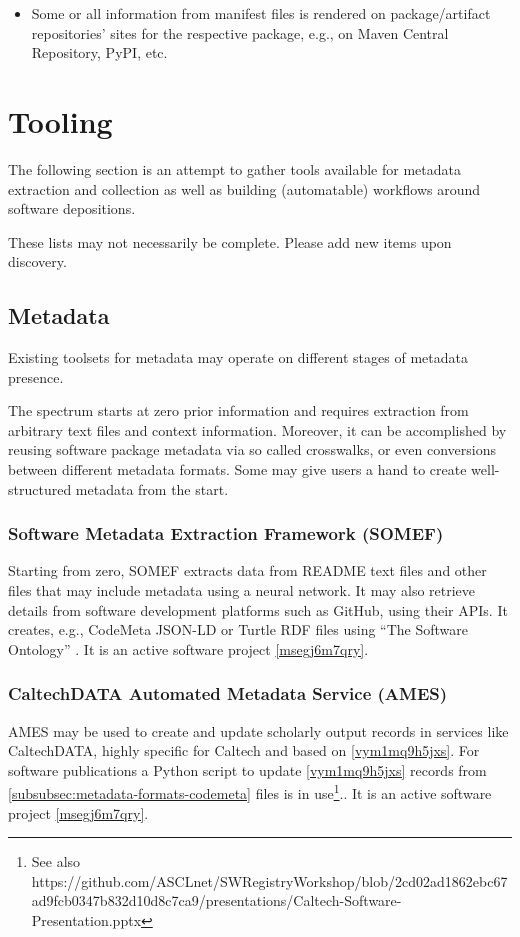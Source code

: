 \documentclass{article}
\begin{document}
\begin{itemize}  
\item Some or all information from manifest files is rendered on package/artifact repositories’ sites for the respective package, e.g., on Maven Central Repository, PyPI, etc.


\end{itemize}

\section{Tooling}\label{sec:tooling}
The following section is an attempt to gather tools available for metadata extraction and collection as well as building (automatable) workflows around software depositions.

These lists may not necessarily be complete. Please add new items upon discovery. 



\subsection{Metadata}\label{subsec:tooling-metadata}
Existing toolsets for metadata may operate on different stages of metadata presence.

The spectrum starts at zero prior information and requires extraction from arbitrary text files and context information. Moreover, it can be accomplished by reusing software package metadata via so called crosswalks, or even  conversions between different metadata formats. Some may give users a hand to create well-structured metadata from the start.



\subsubsection{Software Metadata Extraction Framework (SOMEF)}\label{qz3d8r3z48k}
Starting from zero, SOMEF \cite{11045035/AWIJVT4K} \cite{11045035/E5BAXQ4Y} extracts data from README text files and other files that may include metadata using a neural network. It may also retrieve details from software development platforms such as GitHub, using their APIs. It creates, e.g., CodeMeta JSON-LD or Turtle RDF files using “The Software Ontology” \cite{11045035/TVVPYY5L}. It is an active software project \ref{msegj6m7qry}.



\subsubsection{CaltechDATA Automated Metadata Service (AMES)}\label{v9uri13hoesk}
AMES \cite{11045035/CBYX26KG} may be used to create and update scholarly output records in services like CaltechDATA, highly specific for Caltech and based on \ref{vym1mq9h5jxs}. For software publications a Python script to update \ref{vym1mq9h5jxs} records from \ref{subsubsec:metadata-formats-codemeta} files is in use\footnote{See also https://github.com/ASCLnet/SWRegistryWorkshop/blob/2cd02ad1862ebc67ad9fcb0347b832d10d8c7ca9/presentations/Caltech-Software-Presentation.pptx}.. It is an active software project \ref{msegj6m7qry}.
\end{document}

